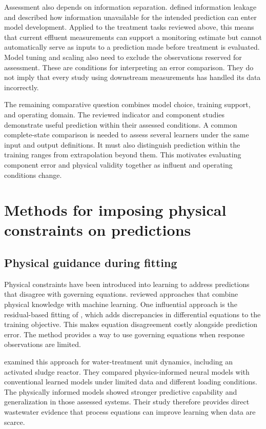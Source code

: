 Assessment also depends on information separation. \citet{Kaufman2012} defined information leakage and described how information unavailable for the intended prediction can enter model development. Applied to the treatment tasks reviewed above, this means that current effluent measurements can support a monitoring estimate but cannot automatically serve as inputs to a prediction made before treatment is evaluated. Model tuning and scaling also need to exclude the observations reserved for assessment. These are conditions for interpreting an error comparison. They do not imply that every study using downstream measurements has handled its data incorrectly.

The remaining comparative question combines model choice, training support, and operating domain. The reviewed indicator and component studies demonstrate useful prediction within their assessed conditions. A common complete-state comparison is needed to assess several learners under the same input and output definitions. It must also distinguish prediction within the training ranges from extrapolation beyond them. This motivates evaluating component error and physical validity together as influent and operating conditions change.

\section{Methods for imposing physical constraints on predictions}

\subsection{Physical guidance during fitting}

Physical constraints have been introduced into learning to address predictions that disagree with governing equations. \citet{Karniadakis2021} reviewed approaches that combine physical knowledge with machine learning. One influential approach is the residual-based fitting of \citet{Raissi2019}, which adds discrepancies in differential equations to the training objective. This makes equation disagreement costly alongside prediction error. The method provides a way to use governing equations when response observations are limited.

\citet{Li2024} examined this approach for water-treatment unit dynamics, including an activated sludge reactor. They compared physics-informed neural models with conventional learned models under limited data and different loading conditions. The physically informed models showed stronger predictive capability and generalization in those assessed systems. Their study therefore provides direct wastewater evidence that process equations can improve learning when data are scarce.

